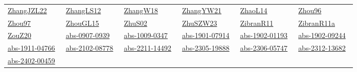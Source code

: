 \begin{longtable}{*{6}{l}}
\href{../works/ZhangJZL22.pdf}{ZhangJZL22}~\cite{ZhangJZL22} & \href{../works/ZhangLS12.pdf}{ZhangLS12}~\cite{ZhangLS12} & \href{../works/ZhangW18.pdf}{ZhangW18}~\cite{ZhangW18} & \href{../works/ZhangYW21.pdf}{ZhangYW21}~\cite{ZhangYW21} & \href{../works/ZhaoL14.pdf}{ZhaoL14}~\cite{ZhaoL14} & \href{../works/Zhou96.pdf}{Zhou96}~\cite{Zhou96}\\ 
\href{../works/Zhou97.pdf}{Zhou97}~\cite{Zhou97} & \href{../works/ZhouGL15.pdf}{ZhouGL15}~\cite{ZhouGL15} & \href{../works/ZhuS02.pdf}{ZhuS02}~\cite{ZhuS02} & \href{../works/ZhuSZW23.pdf}{ZhuSZW23}~\cite{ZhuSZW23} & \href{../works/ZibranR11.pdf}{ZibranR11}~\cite{ZibranR11} & \href{../works/ZibranR11a.pdf}{ZibranR11a}~\cite{ZibranR11a}\\ 
\href{../works/ZouZ20.pdf}{ZouZ20}~\cite{ZouZ20} & \href{../works/abs-0907-0939.pdf}{abs-0907-0939}~\cite{abs-0907-0939} & \href{../works/abs-1009-0347.pdf}{abs-1009-0347}~\cite{abs-1009-0347} & \href{../works/abs-1901-07914.pdf}{abs-1901-07914}~\cite{abs-1901-07914} & \href{../works/abs-1902-01193.pdf}{abs-1902-01193}~\cite{abs-1902-01193} & \href{../works/abs-1902-09244.pdf}{abs-1902-09244}~\cite{abs-1902-09244}\\ 
\href{../works/abs-1911-04766.pdf}{abs-1911-04766}~\cite{abs-1911-04766} & \href{../works/abs-2102-08778.pdf}{abs-2102-08778}~\cite{abs-2102-08778} & \href{../works/abs-2211-14492.pdf}{abs-2211-14492}~\cite{abs-2211-14492} & \href{../works/abs-2305-19888.pdf}{abs-2305-19888}~\cite{abs-2305-19888} & \href{../works/abs-2306-05747.pdf}{abs-2306-05747}~\cite{abs-2306-05747} & \href{../works/abs-2312-13682.pdf}{abs-2312-13682}~\cite{abs-2312-13682}\\ 
\href{../works/abs-2402-00459.pdf}{abs-2402-00459}~\cite{abs-2402-00459} & \end{longtable}
